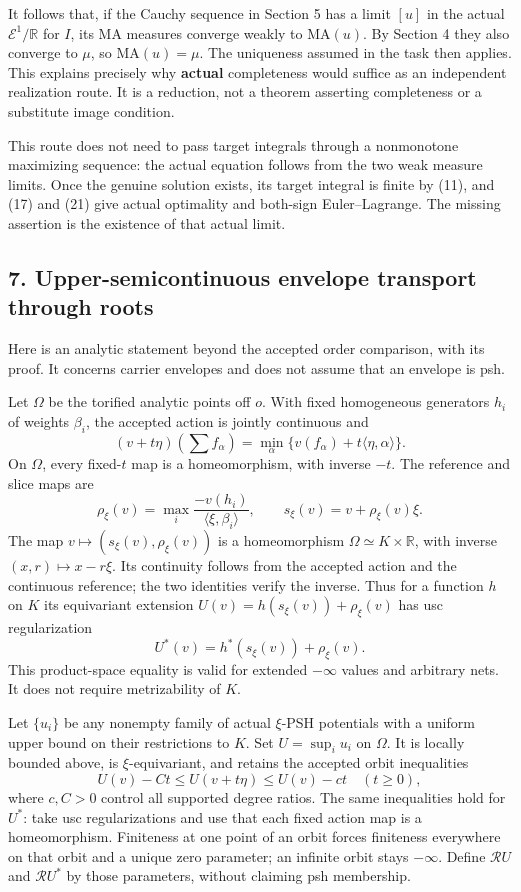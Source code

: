 \documentclass[
  10pt,
]{article}
\begin{document}
It follows that, if the Cauchy sequence in Section 5 has a limit \([u]\)
in the actual \(\mathcal E^1/\mathbb R\) for \(I\), its MA measures
converge weakly to \(\mathrm{MA}(u)\). By Section 4 they also converge
to \(\mu\), so \(\mathrm{MA}(u)=\mu\). The uniqueness assumed in the
task then applies. This explains precisely why \textbf{actual}
completeness would suffice as an independent realization route. It is a
reduction, not a theorem asserting completeness or a substitute image
condition.

This route does not need to pass target integrals through a nonmonotone
maximizing sequence: the actual equation follows from the two weak
measure limits. Once the genuine solution exists, its target integral is
finite by (11), and (17) and (21) give actual optimality and both-sign
Euler--Lagrange. The missing assertion is the existence of that actual
limit.

\subsection{7. Upper-semicontinuous envelope transport through
roots}\label{upper-semicontinuous-envelope-transport-through-roots}

Here is an analytic statement beyond the accepted order comparison, with
its proof. It concerns carrier envelopes and does not assume that an
envelope is psh.

Let \(\Omega\) be the torified analytic points off \(o\). With fixed
homogeneous generators \(h_i\) of weights \(\beta_i\), the accepted
action is jointly continuous and \[
 (v+t\eta)(\textstyle\sum f_\alpha)=\min_\alpha\{v(f_\alpha)+t\langle\eta,\alpha\rangle\}.
\] On \(\Omega\), every fixed-\(t\) map is a homeomorphism, with inverse
\(-t\). The reference and slice maps are \[
 \rho_\xi(v)=\max_i\frac{-v(h_i)}{\langle\xi,\beta_i\rangle},\qquad
 s_\xi(v)=v+\rho_\xi(v)\xi.
\] The map \(v\mapsto(s_\xi(v),\rho_\xi(v))\) is a homeomorphism
\(\Omega\simeq K\times\mathbb R\), with inverse \((x,r)\mapsto x-r\xi\).
Its continuity follows from the accepted action and the continuous
reference; the two identities verify the inverse. Thus for a function
\(h\) on \(K\) its equivariant extension
\(U(v)=h(s_\xi(v))+\rho_\xi(v)\) has usc regularization \[
                        U^*(v)=h^*(s_\xi(v))+\rho_\xi(v).              \tag{29}
\] This product-space equality is valid for extended \(-\infty\) values
and arbitrary nets. It does not require metrizability of \(K\).

Let \(\{u_i\}\) be any nonempty family of actual \(\xi\)-PSH potentials
with a uniform upper bound on their restrictions to \(K\). Set
\(U=\sup_i u_i\) on \(\Omega\). It is locally bounded above, is
\(\xi\)-equivariant, and retains the accepted orbit inequalities \[
 U(v)-Ct\leq U(v+t\eta)\leq U(v)-ct\quad(t\geq0),
 \] where \(c,C>0\) control all supported degree ratios. The same
inequalities hold for \(U^*\): take usc regularizations and use that
each fixed action map is a homeomorphism. Finiteness at one point of an
orbit forces finiteness everywhere on that orbit and a unique zero
parameter; an infinite orbit stays \(-\infty\). Define \(\mathcal R U\)
and \(\mathcal R U^*\) by those parameters, without claiming psh
membership.
\end{document}
